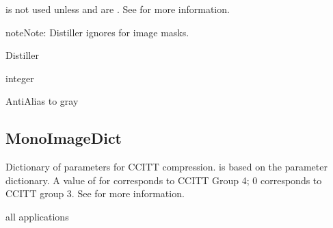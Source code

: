 \documentclass[letterpaper,12pt,english,openany,oneside]{sphinxmanual}
\begin{document}
 is not used unless  and  are  . See  for more information.

\begin{sphinxadmonition}{note}{Note:}
Distiller ignores  for image masks.
\end{sphinxadmonition}
\label{\detokenize{PDF_Create_CommonSettings:supported-by-58}}

Distiller

\label{\detokenize{PDF_Create_CommonSettings:type-58}}

integer

\label{\detokenize{PDF_Create_CommonSettings:ui-name-44}}

Anti\sphinxhyphen{}Alias to gray

\label{\detokenize{PDF_Create_CommonSettings:default-value-54}}

\begin{sphinxVerbatim}[commandchars=\\\{\}]
\end{sphinxVerbatim}




\subsection{MonoImageDict}
\label{\detokenize{PDF_Create_CommonSettings:monoimagedict}}
Dictionary of parameters for CCITT compression.  is based on the  parameter dictionary. A value of  for  corresponds to CCITT Group 4; 0 corresponds to CCITT group 3. See  for more information.

\label{\detokenize{PDF_Create_CommonSettings:supported-by-59}}

all applications

\label{\detokenize{PDF_Create_CommonSettings:type-59}}
\end{document}
